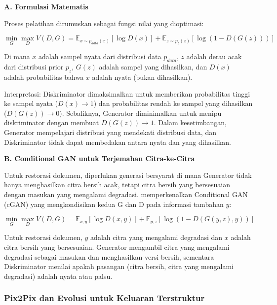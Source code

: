 \vspace{0.5ex}
\noindent\textbf{A. Formulasi Matematis}

Proses pelatihan dirumuskan sebagai fungsi nilai yang dioptimasi:

\begin{equation}
\min_G \max_D V(D, G) = \mathbb{E}_{x \sim p_{data}(x)}[\log D(x)] + \mathbb{E}_{z \sim p_z(z)}[\log(1 - D(G(z)))]
\end{equation}

Di mana $x$ adalah sampel nyata dari distribusi data $p_{data}$, $z$ adalah derau acak dari distribusi prior $p_z$, $G(z)$ adalah sampel yang dihasilkan, dan $D(x)$ adalah probabilitas bahwa $x$ adalah nyata (bukan dihasilkan).

Interpretasi: Diskriminator dimaksimalkan untuk memberikan probabilitas tinggi ke sampel nyata ($D(x) \to 1$) dan probabilitas rendah ke sampel yang dihasilkan ($D(G(z)) \to 0$). Sebaliknya, Generator diminimalkan untuk menipu diskriminator dengan membuat $D(G(z)) \to 1$. Dalam kesetimbangan, Generator mempelajari distribusi yang mendekati distribusi data, dan Diskriminator tidak dapat membedakan antara nyata dan yang dihasilkan.

\vspace{0.5ex}
\noindent\textbf{B. Conditional GAN untuk Terjemahan Citra-ke-Citra}

Untuk restorasi dokumen, diperlukan generasi bersyarat di mana Generator tidak hanya menghasilkan citra bersih acak, tetapi citra bersih yang bersesuaian dengan masukan yang mengalami degradasi. \citep{mirza2014} memperkenalkan Conditional GAN (cGAN) yang mengkondisikan kedua G dan D pada informasi tambahan $y$:

\begin{equation}
\min_G \max_D V(D, G) = \mathbb{E}_{x, y}[\log D(x, y)] + \mathbb{E}_{y, z}[\log(1 - D(G(y, z), y))]
\end{equation}

Untuk restorasi dokumen, $y$ adalah citra yang mengalami degradasi dan $x$ adalah citra bersih yang bersesuaian. Generator mengambil citra yang mengalami degradasi sebagai masukan dan menghasilkan versi bersih, sementara Diskriminator menilai apakah pasangan (citra bersih, citra yang mengalami degradasi) adalah nyata atau palsu.

\subsubsection{Pix2Pix dan Evolusi untuk Keluaran Terstruktur}
\label{subsubsec:pix2pix-evolution}

